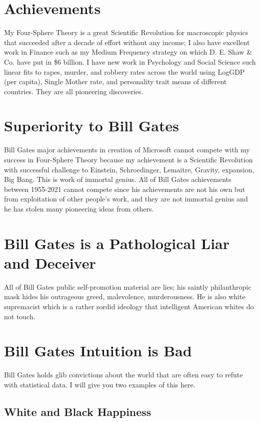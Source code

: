 \documentclass{amsart}
\begin{document}
\section{Achievements}

My Four-Sphere Theory is a great Scientific Revolution for macroscopic physics that succeeded after a decade of effort without any income; I also have excellent work in Finance such as my Medium Frequency strategy on which D. E. Shaw \& Co. have put in \$6 billion.  I have new work in Psychology and Social Science such linear fits to rapes, murder, and robbery rates across the world using LogGDP (per capita), Single Mother rate, and personality trait means of different countries.  They are all pioneering discoveries.

\section{Superiority to Bill Gates}

Bill Gates major achievements in creation of Microsoft cannot compete with my success in Four-Sphere Theory because my achievement is a Scientific Revolution with successful challenge to Einstein, Schroedinger, Lemaitre, Gravity, expansion, Big Bang. This is work of immortal genius.  All of Bill Gates achievements between 1955-2021 cannot compete since his achievements are not his own but from exploitation of other people's work, and they are not immortal genius and he has stolen many pioneering ideas from others.  

\section{Bill Gates is a Pathological Liar and Deceiver}

All of Bill Gates public self-promotion material are lies; his saintly philanthropic mask hides his outrageous greed, malevolence, murderousness.  He is also white supremacist which is a rather sordid ideology that intelligent American whites do not touch.

\section{Bill Gates Intuition is Bad}
Bill Gates holds glib convictions about the world that are often easy to refute with statistical data.  I will give you two examples of this here.

\subsection{White and Black Happiness}
\end{document}
